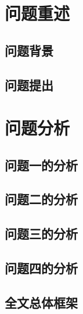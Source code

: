 \documentclass{JXUSTmodeling}
\begin{document}
\keyword{}

\begin{abstract}


\end{abstract}


\section{问题重述}
\subsection{问题背景}

\subsection{问题提出}

\section{问题分析}

\subsection{问题一的分析}

\subsection{问题二的分析}

\subsection{问题三的分析}

\subsection{问题四的分析}

\subsection{全文总体框架}
\end{document}
